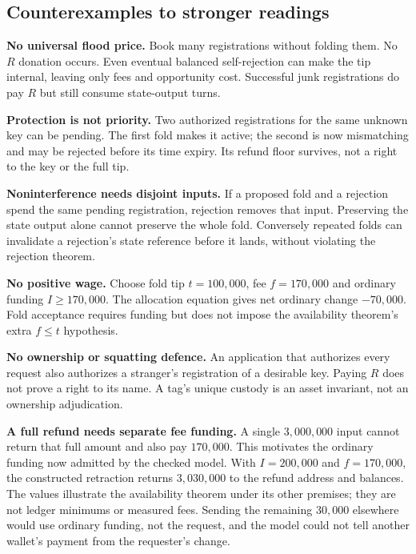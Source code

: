 \subsection{Counterexamples to stronger readings}
\hand \textbf{No universal flood price.} Book many registrations without
folding them. No $R$ donation occurs. Even eventual balanced self-rejection
can make the tip internal, leaving only fees and opportunity cost. Successful
junk registrations do pay $R$ but still consume state-output turns.

\hand \textbf{Protection is not priority.} Two authorized registrations for
the same unknown key can be pending. The first fold makes it active; the
second is now mismatching and may be rejected before its time expiry. Its
refund floor survives, not a right to the key or the full tip.

\hand \textbf{Noninterference needs disjoint inputs.} If a proposed fold and
a rejection spend the same pending registration, rejection removes that
input. Preserving the state output alone cannot preserve the whole fold.
Conversely repeated folds can invalidate a rejection's state reference before
it lands, without violating the rejection theorem.

\hand \textbf{No positive wage.} Choose fold tip $t=100{,}000$, fee
$f=170{,}000$ and ordinary funding $I\ge170{,}000$. The allocation equation
gives net ordinary change $-70{,}000$. Fold acceptance requires funding but
does not impose the availability theorem's extra $f\le t$ hypothesis.

\hand \textbf{No ownership or squatting defence.} An application that
authorizes every request also authorizes a stranger's registration of a
desirable key. Paying $R$ does not prove a right to its name. A tag's unique
custody is an asset invariant, not an ownership adjudication.

\hand \textbf{A full refund needs separate fee funding.} A single
$3{,}000{,}000$ input cannot return that full amount and also pay $170{,}000$.
This motivates the ordinary funding now admitted by the checked model.
With $I=200{,}000$ and $f=170{,}000$, the constructed retraction returns
$3{,}030{,}000$ to the refund address and balances. The values illustrate
the availability theorem under its other premises; they are not ledger
minimums or measured fees. Sending the remaining $30{,}000$ elsewhere would
use ordinary funding, not the request, and the model could not tell another
wallet's payment from the requester's change.
